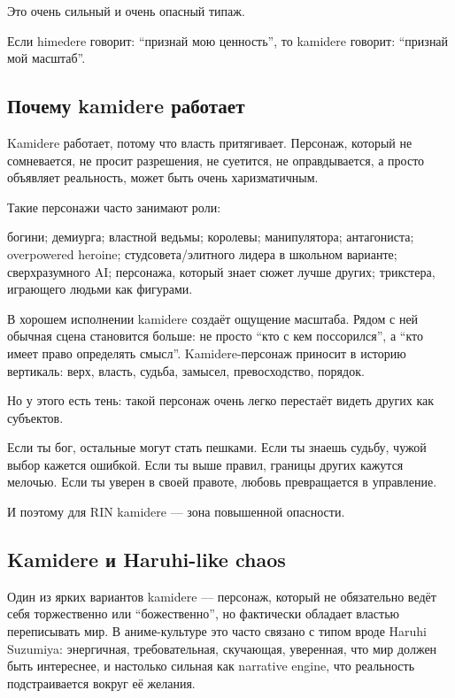 Это очень сильный и очень опасный типаж.

Если himedere говорит: ``признай мою ценность'', то kamidere говорит:
``признай мой масштаб''.

\subsection*{Почему kamidere работает}

Kamidere работает, потому что власть притягивает. Персонаж, который не
сомневается, не просит разрешения, не суетится, не оправдывается, а
просто объявляет реальность, может быть очень харизматичным.

Такие персонажи часто занимают роли:

богини; демиурга; властной ведьмы; королевы; манипулятора; антагониста;
overpowered heroine; студсовета/\hspace{0pt}элитного лидера в школьном варианте;
сверхразумного AI; персонажа, который знает сюжет лучше других;
трикстера, играющего людьми как фигурами.

В хорошем исполнении kamidere создаёт ощущение масштаба. Рядом с ней
обычная сцена становится больше: не просто ``кто с кем поссорился'', а
``кто имеет право определять смысл''. Kamidere-персонаж приносит в
историю вертикаль: верх, власть, судьба, замысел, превосходство,
порядок.

Но у этого есть тень: такой персонаж очень легко перестаёт видеть других
как субъектов.

Если ты бог, остальные могут стать пешками. Если ты знаешь судьбу, чужой
выбор кажется ошибкой. Если ты выше правил, границы других кажутся
мелочью. Если ты уверен в своей правоте, любовь превращается в
управление.

И поэтому для RIN kamidere --- зона повышенной опасности.

\subsection*{Kamidere и Haruhi-like chaos}

Один из ярких вариантов kamidere --- персонаж, который не обязательно
ведёт себя торжественно или ``божественно'', но фактически обладает
властью переписывать мир. В аниме-культуре это часто связано с типом
вроде Haruhi Suzumiya: энергичная, требовательная, скучающая, уверенная,
что мир должен быть интереснее, и настолько сильная как narrative
engine, что реальность подстраивается вокруг её желания.


